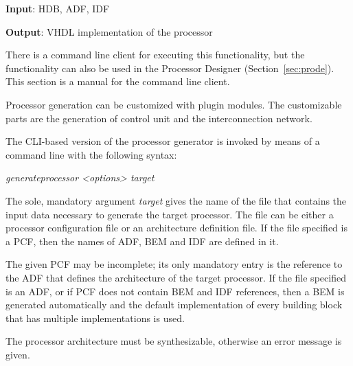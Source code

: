 \documentclass[twoside]{tceusermanual}
\begin{document}
\textbf{Input}: HDB, ADF, IDF

\textbf{Output}: VHDL implementation of the processor

There is a command line client for executing this functionality, but the
functionality can also be used in the Processor Designer
(Section~\ref{sec:prode}). This section is a manual for the command line
client.

Processor generation can be customized with plugin modules. The customizable
parts are the generation of control unit and the interconnection network.

The CLI-based version of the processor generator is invoked by means of a
command line with the following syntax:

  \textit{generateprocessor <options> target}

The sole, mandatory argument \emph{target} gives the name of the file that
contains the input data necessary to generate the target processor. The file
can be either a processor configuration file or an architecture definition
file. If the file specified is a PCF, then the names of ADF, BEM and IDF are
defined in it.

The given PCF may be incomplete; its only mandatory entry is the reference
to the ADF that defines the architecture of the target processor.  If the
file specified is an ADF, or if PCF does not contain BEM and IDF references,
then a BEM is generated automatically and the default implementation of every
building block that has multiple implementations is used.

The processor architecture must be synthesizable, otherwise an error message
is given. \\
\end{document}
